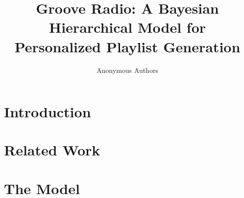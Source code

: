 \documentclass{sig-alternate}
\title{Groove Radio: A Bayesian Hierarchical Model for Personalized Playlist Generation
\GLw{Current version is just over 9 pages without comments}}
\begin{document}


\author{
	\alignauthor
	Anonymous Authors\\
	\alignauthor
}



\maketitle

\vspace{-4mm}
\begin{abstract}
	
\end{abstract}
\vspace{-2mm}     
\section{Introduction}
\label{sec:Introduction}
   
\vspace{-2mm}
\section{Related Work}
\label{sec:Related}
    
\vspace{-2mm}    
\section{The Model}
\label{sec:ourapproach}
    
\vspace{-2mm}    
\end{document}
